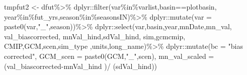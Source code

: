 \documentclass[
]{article}
\newenvironment{Shaded}{\begin{snugshade}}{\end{snugshade}}
\newcommand{\AttributeTok}[1]{\textcolor[rgb]{0.77,0.63,0.00}{#1}}
\newcommand{\FunctionTok}[1]{\textcolor[rgb]{0.00,0.00,0.00}{#1}}
\newcommand{\NormalTok}[1]{#1}
\newcommand{\OtherTok}[1]{\textcolor[rgb]{0.56,0.35,0.01}{#1}}
\newcommand{\SpecialCharTok}[1]{\textcolor[rgb]{0.00,0.00,0.00}{#1}}
\newcommand{\StringTok}[1]{\textcolor[rgb]{0.31,0.60,0.02}{#1}}
\begin{document}
\begin{Shaded}
\begin{Highlighting}[]
\NormalTok{       tmpfut2    }\OtherTok{\textless{}{-}}\NormalTok{ dfut}\SpecialCharTok{\%\textgreater{}\%}
\NormalTok{         dplyr}\SpecialCharTok{::}\FunctionTok{filter}\NormalTok{(var}\SpecialCharTok{\%in\%}\NormalTok{varlist,basin}\SpecialCharTok{==}\NormalTok{plotbasin,}
\NormalTok{                       year}\SpecialCharTok{\%in\%}\NormalTok{fut\_yrs,season}\SpecialCharTok{\%in\%}\NormalTok{seasonsIN)}\SpecialCharTok{\%\textgreater{}\%}
\NormalTok{         dplyr}\SpecialCharTok{::}\FunctionTok{mutate}\NormalTok{(}\AttributeTok{var =} \FunctionTok{paste0}\NormalTok{(var,}\StringTok{"\_"}\NormalTok{,season))}\SpecialCharTok{\%\textgreater{}\%}
\NormalTok{         dplyr}\SpecialCharTok{::}\FunctionTok{select}\NormalTok{(var,basin,year,mnDate,mn\_val, val\_biascorrected, }
\NormalTok{                       mnVal\_hind,sdVal\_hind, sim,gcmcmip,}
\NormalTok{                       CMIP,GCM,scen,sim\_type ,units,long\_name)}\SpecialCharTok{\%\textgreater{}\%}
\NormalTok{         dplyr}\SpecialCharTok{::}\FunctionTok{mutate}\NormalTok{(}\AttributeTok{bc =} \StringTok{"bias corrected"}\NormalTok{,}
                       \AttributeTok{GCM\_scen =} \FunctionTok{paste0}\NormalTok{(GCM,}\StringTok{"\_"}\NormalTok{,scen),}
                       \AttributeTok{mn\_val\_scaled =}\NormalTok{ (val\_biascorrected}\SpecialCharTok{{-}}\NormalTok{mnVal\_hind )}\SpecialCharTok{/}
\NormalTok{                         (sdVal\_hind))}
       

\end{Highlighting}
\end{Shaded}
\end{document}
